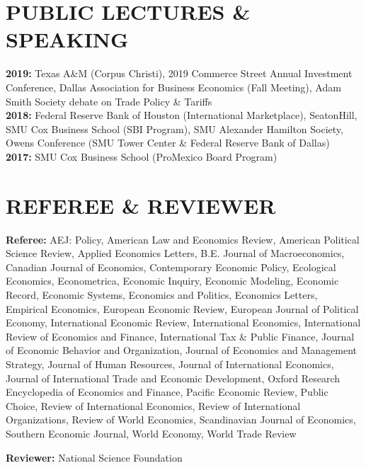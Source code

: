 \documentclass[11pt]{res}
\begin{document}
\begin{resume}
\section{PUBLIC LECTURES \& SPEAKING}\vspace{1.5mm}
{\bf 2019:} Texas A\&M (Corpus Christi), 2019 Commerce Street Annual Investment Conference, Dallas Association for Business Economics (Fall Meeting), Adam Smith Society debate on Trade Policy \& Tariffs\vspace{1.5mm}\\
{\bf 2018:} Federal Reserve Bank of Houston (International Marketplace), SeatonHill, SMU Cox Business School (SBI Program), SMU Alexander Hamilton Society, Owens Conference (SMU Tower Center \& Federal Reserve Bank of Dallas)\vspace{1.5mm}\\
{\bf 2017:} SMU Cox Business School (ProMexico Board Program)

\section{REFEREE \& REVIEWER} \vspace{1.5mm}
{\bf Referee:} AEJ: Policy, American Law and Economics Review, American Political Science Review, Applied Economics Letters, B.E. Journal of Macroeconomics, Canadian Journal of Economics, Contemporary Economic Policy, Ecological Economics, Econometrica, Economic Inquiry, Economic Modeling, Economic Record, Economic Systems, Economics and Politics, Economics Letters, Empirical Economics, European Economic Review, European Journal of Political Economy, International Economic Review, International Economics, International Review of Economics and Finance, International Tax \& Public Finance, Journal of Economic Behavior and Organization, Journal of Economics and Management Strategy, Journal of Human Resources, Journal of International Economics, Journal of International Trade and Economic Development, Oxford Research Encyclopedia of Economics and Finance, Pacific Economic Review, Public Choice, Review of International Economics, Review of International Organizations, Review of World Economics, Scandinavian Journal of Economics, Southern Economic Journal, World Economy, World Trade Review

{\bf Reviewer:} National Science Foundation


\end{resume}
\end{document}
